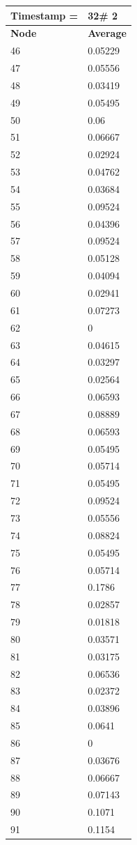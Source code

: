 \begin{tabular}{|l||l|}
\hline
\textbf{Timestamp =} & \textbf{32}\# 2\\\hline
	\textbf{Node} & \textbf{Average} \\ \hline
\hline
	46 & 0.05229 \\ \hline
	47 & 0.05556 \\ \hline
	48 & 0.03419 \\ \hline
	49 & 0.05495 \\ \hline
	50 & 0.06 \\ \hline
	51 & 0.06667 \\ \hline
	52 & 0.02924 \\ \hline
	53 & 0.04762 \\ \hline
	54 & 0.03684 \\ \hline
	55 & 0.09524 \\ \hline
	56 & 0.04396 \\ \hline
	57 & 0.09524 \\ \hline
	58 & 0.05128 \\ \hline
	59 & 0.04094 \\ \hline
	60 & 0.02941 \\ \hline
	61 & 0.07273 \\ \hline
	62 & 0 \\ \hline
	63 & 0.04615 \\ \hline
	64 & 0.03297 \\ \hline
	65 & 0.02564 \\ \hline
	66 & 0.06593 \\ \hline
	67 & 0.08889 \\ \hline
	68 & 0.06593 \\ \hline
	69 & 0.05495 \\ \hline
	70 & 0.05714 \\ \hline
	71 & 0.05495 \\ \hline
	72 & 0.09524 \\ \hline
	73 & 0.05556 \\ \hline
	74 & 0.08824 \\ \hline
	75 & 0.05495 \\ \hline
	76 & 0.05714 \\ \hline
	77 & 0.1786 \\ \hline
	78 & 0.02857 \\ \hline
	79 & 0.01818 \\ \hline
	80 & 0.03571 \\ \hline
	81 & 0.03175 \\ \hline
	82 & 0.06536 \\ \hline
	83 & 0.02372 \\ \hline
	84 & 0.03896 \\ \hline
	85 & 0.0641 \\ \hline
	86 & 0 \\ \hline
	87 & 0.03676 \\ \hline
	88 & 0.06667 \\ \hline
	89 & 0.07143 \\ \hline
	90 & 0.1071 \\ \hline
	91 & 0.1154 \\ \hline
\end{tabular}
